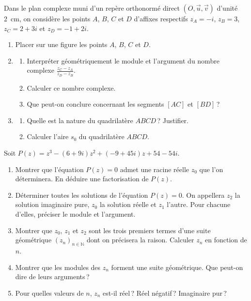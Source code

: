 \begin{exo}
      Dans le plan complexe muni d'un rep\`ere orthonorm\'e direct $(O,\vec{u},\vec{v})$ d'unit\'e 2~cm,
      on consid\`ere les points $A$, $B$, $C$ et $D$ d'affixes respectifs 
            $z_A = -i$, $z_B = 3$, $z_C = 2+3i$ et $z_D = -1+2i$.
      \begin{enumerate}
            \item Placer sur une figure les points $A$, $B$, $C$ et $D$.
            \item \begin{enumerate}
                        \item Interpr\'eter g\'eom\'etriquement le module et l'argument du nombre complexe 
                              $\displaystyle{ \frac{z_C - z_A}{z_D - z_B} }$.
                        \item Calculer ce nombre complexe.
                        \item Que peut-on conclure concernant les segments $[AC]$ et $[BD]$\,?
                  \end{enumerate}
            \item \begin{enumerate}
                        \item Quelle est la nature du quadrilat\`ere $ABCD$\,? Justifier.
                        \item Calculer l'aire $s_0$ du quadrilat\`ere $ABCD$.
                  \end{enumerate}
      \end{enumerate}
\end{exo}
%
\begin{exo}
      Soit $P(z) = z^3 - (6+9i) z^2 + (-9+45i) z + 54 - 54 i$.
      \begin{enumerate}
            \item Montrer que l'\'equation $P(z) = 0$ admet une racine r\'eelle $z_0$ que l'on d\'eterminera.
                  En d\'eduire une factorisation de $P(z)$.
            \item D\'eterminer toutes les solutions de l'\'equation $P(z) = 0$.
                  On appellera $z_2$ la solution imaginaire pure, $z_0$ la solution r\'eelle et $z_1$ l'autre.
                  Pour chacune d'elles, pr\'eciser le module et l'argument.
            \item Montrer que $z_0$, $z_1$ et $z_2$ sont les trois premiers termes d'une suite g\'eom\'etrique
                  $(z_n)_{n\in\mathbb{N}}$ dont on pr\'ecisera la raison.
                  Calculer $z_n$ en fonction de $n$.
            \item Montrer que les modules des $z_n$ forment une suite g\'eom\'etrique.
                  Que peut-on dire de leurs arguments\,?
            \item Pour quelles valeurs de $n$, $z_n$ est-il r\'eel\,?
                  R\'eel n\'egatif\,?
                  Imaginaire pur\,?
      \end{enumerate}
\end{exo}
